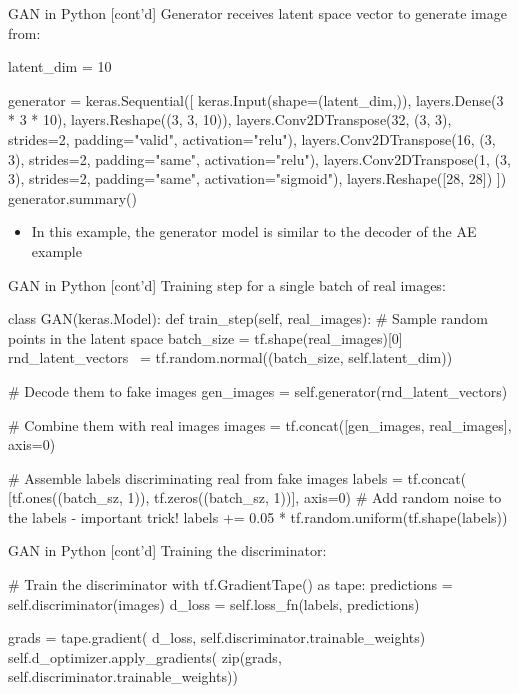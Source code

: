 \documentclass[ignorenonframetext,xcolor=x11names]{beamer}
\begin{document}
\begin{frame}[fragile]{GAN in Python \small [cont'd]}
Generator receives latent space vector to generate image from:

\begin{pythoncode}
latent_dim = 10

generator = keras.Sequential([
    keras.Input(shape=(latent_dim,)),
    layers.Dense(3 * 3 * 10),
    layers.Reshape((3, 3, 10)),
    layers.Conv2DTranspose(32, (3, 3), strides=2, 
        padding="valid", activation="relu"),
    layers.Conv2DTranspose(16, (3, 3), strides=2, 
        padding="same", activation="relu"),
    layers.Conv2DTranspose(1, (3, 3), strides=2, 
        padding="same", activation="sigmoid"),
    layers.Reshape([28, 28])
])
generator.summary()
\end{pythoncode}
\begin{itemize}
   \item In this example, the generator model is similar to the decoder of the AE example
\end{itemize}
\end{frame}

\begin{frame}[fragile]{GAN in Python \small [cont'd]}
Training step for a single batch of real images:
\begin{pythoncode}
class GAN(keras.Model):
    def train_step(self, real_images):
        # Sample random points in the latent space
        batch_size = tf.shape(real_images)[0]
        rnd_latent_vectors \
            = tf.random.normal((batch_size, self.latent_dim))

        # Decode them to fake images
        gen_images = self.generator(rnd_latent_vectors)

        # Combine them with real images
        images = tf.concat([gen_images, real_images], axis=0)

        # Assemble labels discriminating real from fake images
        labels = tf.concat(
            [tf.ones((batch_sz, 1)), 
            tf.zeros((batch_sz, 1))], axis=0)
        # Add random noise to the labels - important trick!
        labels += 0.05 * tf.random.uniform(tf.shape(labels))
\end{pythoncode}
\end{frame}

\begin{frame}[fragile]{GAN in Python \small [cont'd]}
Training the discriminator:
\begin{pythoncode}
        # Train the discriminator
        with tf.GradientTape() as tape:
            predictions = self.discriminator(images)
            d_loss = self.loss_fn(labels, predictions)
            
        grads = tape.gradient(
            d_loss, 
            self.discriminator.trainable_weights)
        self.d_optimizer.apply_gradients(
            zip(grads, self.discriminator.trainable_weights))
\end{pythoncode}
\end{frame}
\end{document}
